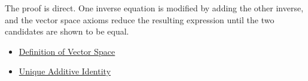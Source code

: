 \begin{remark*}
The proof is direct. One inverse equation is modified by adding the other inverse, and the vector space axioms reduce the resulting expression until the two candidates are shown to be equal.
\end{remark*}

\begin{remark*}[Dependencies]
\hfill
\begin{itemize}
  \item \hyperref[def:vector-space]{Definition of Vector Space}
  \item \hyperref[thm:unique-additive-identity]{Unique Additive Identity}
\end{itemize}
\end{remark*}
